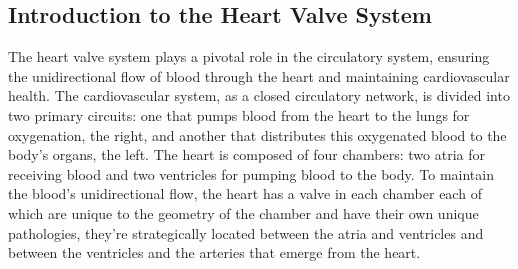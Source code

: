 \subsection{Introduction to the Heart Valve System}
The heart valve system plays a pivotal role in the circulatory system, ensuring the unidirectional flow of blood through the heart and maintaining cardiovascular health. The cardiovascular system, as a closed circulatory network, is divided into two primary circuits: one that pumps blood from the heart to the lungs for oxygenation, the right, and another that distributes this oxygenated blood to the body's organs, the left. The heart is composed of four chambers: two atria for receiving blood and two ventricles for pumping blood to the body. To maintain the blood's unidirectional flow, the heart has a valve in each chamber each of which are unique to the geometry of the chamber and have their own unique pathologies, they're strategically located between the atria and ventricles and between the ventricles and the arteries that emerge from the heart. ~

